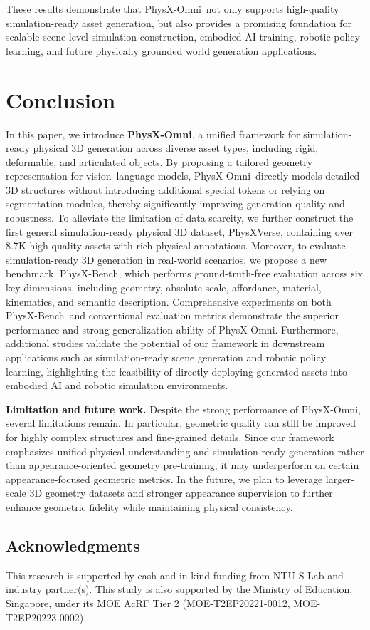 \documentclass[11pt]{article}
\def\ourname{PhysX-Omni}
\def\ournewdata{PhysXVerse}
\def\ourbench{PhysX-Bench}
\begin{document}
These results demonstrate that \ourname\ not only supports high-quality simulation-ready asset generation, but also provides a promising foundation for scalable scene-level simulation construction, embodied AI training, robotic policy learning, and future physically grounded world generation applications.


\section{Conclusion}

In this paper, we introduce \textbf{\ourname}, a unified framework for simulation-ready physical 3D generation across diverse asset types, including rigid, deformable, and articulated objects. By proposing a tailored geometry representation for vision--language models, \ourname\ directly models detailed 3D structures without introducing additional special tokens or relying on segmentation modules, thereby significantly improving generation quality and robustness. To alleviate the limitation of data scarcity, we further construct the first general simulation-ready physical 3D dataset, \ournewdata, containing over 8.7K high-quality assets with rich physical annotations. Moreover, to evaluate simulation-ready 3D generation in real-world scenarios, we propose a new benchmark, \ourbench, which performs ground-truth-free evaluation across six key dimensions, including geometry, absolute scale, affordance, material, kinematics, and semantic description. Comprehensive experiments on both \ourbench\ and conventional evaluation metrics demonstrate the superior performance and strong generalization ability of \ourname. Furthermore, additional studies validate the potential of our framework in downstream applications such as simulation-ready scene generation and robotic policy learning, highlighting the feasibility of directly deploying generated assets into embodied AI and robotic simulation environments.

\noindent\textbf{Limitation and future work.} Despite the strong performance of \ourname, several limitations remain. In particular, geometric quality can still be improved for highly complex structures and fine-grained details. Since our framework emphasizes unified physical understanding and simulation-ready generation rather than appearance-oriented geometry pre-training, it may underperform on certain appearance-focused geometric metrics. In the future, we plan to leverage larger-scale 3D geometry datasets and stronger appearance supervision to further enhance geometric fidelity while maintaining physical consistency.

\subsection{Acknowledgments}
This research is supported by cash and in-kind funding from NTU S-Lab and industry partner(s). This study is also supported by the Ministry of Education, Singapore, under its MOE AcRF Tier 2 (MOE-T2EP20221-0012, MOE-T2EP20223-0002). 



\end{document}
